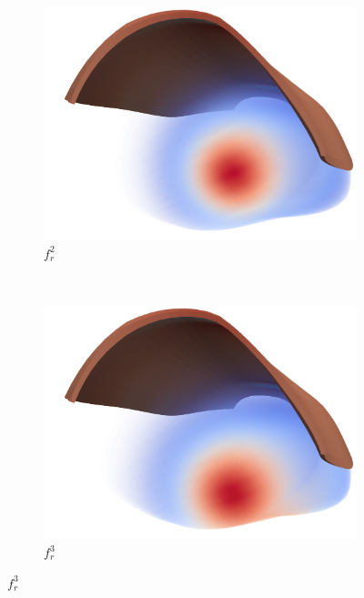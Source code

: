 \begin{figure}[H]
\begin{subfigure}[t]{0.23\textwidth}
    \centering%
    \includegraphics[width=\textwidth]{images/results/application/multidomain_fr2_cropped.png}%
    \caption{$f_r^2$}%
    \label{fig:fr2}%
  \end{subfigure}
  \,
  \begin{subfigure}[t]{0.23\textwidth}%
    \centering%
    \includegraphics[width=\textwidth]{images/results/application/multidomain_fr3_cropped.png}%
    \caption{$f_r^3$}%
    \label{fig:fr3}%
  \end{subfigure}
\end{figure}%


